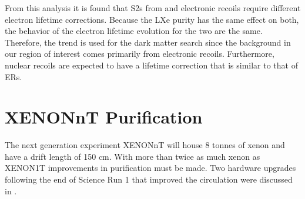 From this analysis it is found that S2s from \alphadecays and electronic recoils require different electron lifetime corrections.  Because
the LXe
purity has the same effect on both, the behavior of the electron lifetime evolution for the two are the same.  Therefore, the \metakr trend
is used for the dark matter search since the background in our region of interest comes primarily from electronic
recoils.  Furthermore, nuclear recoils are expected to have a lifetime correction that is similar to that of ERs.

\section{XENONnT Purification}
\label{sec:xenonnt}
The next generation experiment XENONnT will house 8 tonnes of xenon and have a drift length of 150 cm.  With more than twice as much xenon as
XENON1T improvements in purification must be made.  Two hardware upgrades following the end of Science Run 1 that improved the circulation
were discussed in .